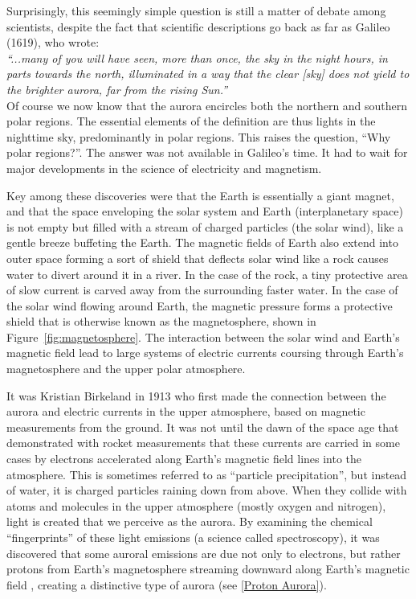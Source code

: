 \documentclass{article}
\renewcommand{\cite}[1]{\parencite{#1}}
\begin{document}
Surprisingly, this seemingly simple question is still a matter of debate among scientists, despite the fact that scientific descriptions go back as far as Galileo (1619), who wrote:\\
\textit{``...many of you will have seen, more than once, the sky in the night hours, in parts towards the north, illuminated in a way that the clear [sky] does not yield to the brighter aurora, far from the rising Sun.''}\\
Of course we now know that the aurora encircles both the northern and southern polar regions. The essential elements of the definition are thus lights in the nighttime sky, predominantly in polar regions. This raises the question, ``Why polar regions?''. The answer was not available in Galileo's time. It had to wait for major developments in the science of electricity and magnetism. 

Key among these discoveries were that the Earth is essentially a giant magnet, and that the space enveloping the solar system and Earth (interplanetary space) is not empty but filled with a stream of charged particles (the solar wind), like a gentle breeze buffeting the Earth. The magnetic fields of Earth also extend into outer space forming a sort of shield that deflects solar wind like a rock causes water to divert around it in a river. In the case of the rock, a tiny protective area of slow current is carved away from the surrounding faster water. In the case of the solar wind flowing around Earth, the magnetic pressure forms a protective shield that is otherwise known as the magnetosphere, shown in Figure~\ref{fig:magnetosphere}. The interaction between the solar wind and Earth's magnetic field lead to large systems of electric currents coursing through Earth's magnetosphere and the upper polar atmosphere. 

It was Kristian Birkeland in 1913 who first made the connection between the aurora and electric currents in the upper atmosphere, based on magnetic measurements from the ground. It was not until the dawn of the space age that \textcite{McIlwain1960} demonstrated with rocket measurements that these currents are carried in some cases by electrons accelerated along Earth's magnetic field lines into the atmosphere. This is sometimes referred to as ``particle precipitation'', but instead of water, it is charged particles raining down from above. When they collide with atoms and molecules in the upper atmosphere (mostly oxygen and nitrogen), light is created that we perceive as the aurora. By examining the chemical ``fingerprints'' of these light emissions (a science called spectroscopy), it was discovered that some auroral emissions are due not only to electrons, but rather protons from Earth's magnetosphere streaming downward along Earth's magnetic field \cite{Vegard1939}, creating a distinctive type of aurora (see \ref{Proton Aurora}).  
\end{document}
